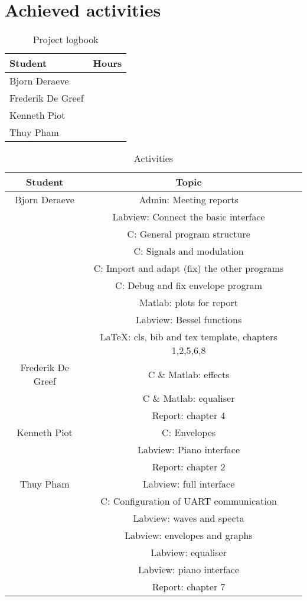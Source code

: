 \section{Achieved activities}
\begin{table}[hbp]
\begin{center}
\begin{tabular}[htbp]{| >{\centering\arraybackslash}m{4cm} | >{\centering\arraybackslash}m{4cm} |}
\hline
\textbf{Student} & \textbf{Hours}\\
\hline
Bjorn Deraeve & 210\\
\hline
Frederik De Greef & 140 \\
\hline
Kenneth Piot & 140 \\
\hline
Thuy Pham & 180 \\
\hline
\end{tabular}
\caption{Project logbook}
\label{tab:logs}
\end{center}
\end{table}
\begin{table}[!htbp]
\begin{center}
\begin{tabular}[!htbp]{|c|c|c|}
\hline
\textbf{Student} & \textbf{Topic}\\
\hline
Bjorn Deraeve & Admin: Meeting reports\\ 
& Labview: Connect the basic interface\\
& C: General program structure \\
& C: Signals and modulation \\
& C: Import and adapt (fix) the other programs\\ 
& C: Debug and fix envelope program\\
& Matlab: plots for report\\
& Labview: Bessel functions\\
& \LaTeX: cls, bib and tex template, chapters 1,2,5,6,8\\
\hline
Frederik De Greef & C \& Matlab: effects \\
& C \& Matlab: equaliser\\
& Report: chapter 4\\
\hline
Kenneth Piot & C: Envelopes \\
& Labview: Piano interface \\
& Report: chapter 2\\
\hline
Thuy Pham & Labview: full interface \\
& C: Configuration of UART communication \\
& Labview: waves and specta \\
& Labview: envelopes and graphs \\
& Labview: equaliser \\
& Labview: piano interface \\
& Report: chapter 7\\
\hline
\end{tabular}
\caption{Activities}
\label{tab:acts}
\end{center}
\end{table}
